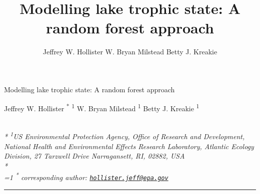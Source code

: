 \documentclass[12pt,]{article}
\title{Modelling lake trophic state: A random forest approach}
\author{
Jeffrey W. Hollister
W. Bryan Milstead
Betty J. Kreakie
}
\begin{document}
\begin{singlespace}
\begin{center}
\huge Modelling lake trophic state: A random forest approach
\end{center}
\begin{center}
\large
Jeffrey W. Hollister \textsuperscript{*} \textsuperscript{1} 
W. Bryan Milstead \textsuperscript{1} 
Betty J. Kreakie \textsuperscript{1} 
\end{center}
\begin{justify}
\footnotesize \emph{ 
\\*
\textsuperscript{1}US Environmental Protection Agency, Office of Research and Development,
National Health and Environmental Effects Research Laboratory, Atlantic
Ecology Division, 27 Tarzwell Drive Narragansett, RI, 02882, USA\\*
}
\setcounter{num}{1}
\\[0.1cm]
\footnotesize \emph{ 
\ifnum\value{num}=1%
\textsuperscript{*} corresponding author:
\fi
\href{mailto:hollister.jeff@epa.gov}{\nolinkurl{hollister.jeff@epa.gov}}
}
\end{justify}
\normalsize

\end{singlespace}


\singlespace

\vspace{2mm}

\hrule
\end{document}
